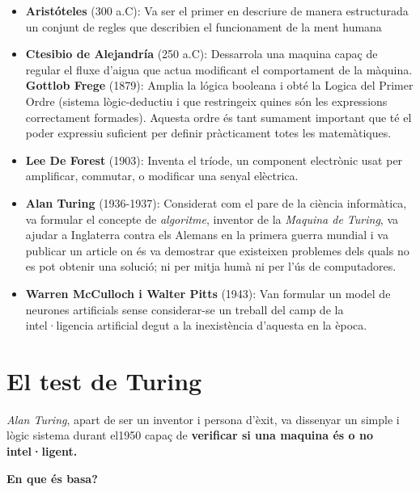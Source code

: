 \begin{itemize}
\item  \textbf{Aristóteles} (300 a.C): Va ser el primer en descriure de manera estructurada un conjunt de regles que describien el funcionament de la ment humana
\item  \textbf{Ctesibio de Alejandría} (250 a.C): Dessarrola una maquina capaç de regular el fluxe d'aigua que actua modificant el comportament de la màquina.
\tiem \textbf{Gottlob Frege} (1879): Amplia la lógica booleana i obté la Logica del Primer Ordre (sistema lògic-deductiu i que restringeix quines són les expressions correctament formades). Aquesta ordre és tant sumament important que té el poder expressiu suficient per definir pràcticament totes les matemàtiques.
\item \textbf{Lee De Forest} (1903): Inventa el tríode, un component electrònic usat per amplificar, commutar, o modificar una senyal elèctrica. \cite{Tri}
\item \textbf{Alan Turing} (1936-1937): Considerat com el pare de la ciència informàtica, va formular el concepte de \emph{algoritme}, inventor de la \emph{Maquina de Turing}, va ajudar a Inglaterra contra els Alemans en la primera guerra mundial i va publicar un article on és va demostrar que existeixen problemes dels quals no es pot obtenir una solució; ni per mitja humà ni per l'ús de computadores.
\item \textbf{Warren McCulloch i Walter Pitts} (1943): Van formular un model de neurones artificials sense considerar-se un treball del camp de la intel·ligencia artificial degut a la inexistència d'aquesta en la època.\cite{EvoIA}
\end{itemize} 

\section{El test de Turing}

\emph{Alan Turing}, apart de ser un inventor i persona d'èxit, va dissenyar un simple i lògic sistema durant el1950 capaç de \textbf{verificar si una maquina és o no intel·ligent.} 

\begin{itemize}
\textbf{En que és basa?}
\end{itemize}

